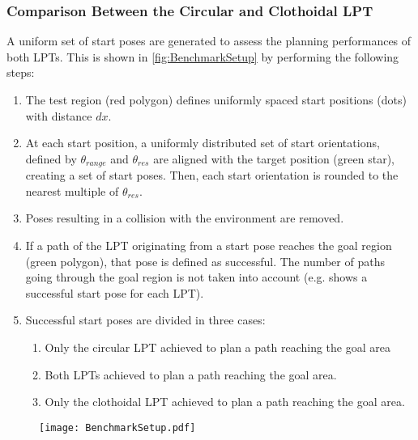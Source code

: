 \newpage

\subsubsection{Comparison Between the Circular and Clothoidal LPT}
A uniform set of start poses are generated to assess the planning performances of both LPTs.
This is shown in \cref{fig:BenchmarkSetup} by performing the following steps:
\vspace{1em}
\begin{enumerate}
\item The test region (red polygon) defines uniformly spaced start positions (dots) with distance $dx$.
\item At each start position, a uniformly distributed set of start orientations, defined by $\theta_{range}$ and $\theta_{res}$ are aligned  with the target position (green star), creating a set of start poses. Then, each start orientation is rounded to the nearest multiple of $\theta_{res}$.
\item Poses resulting in a collision with the environment are removed.
\item If a path of the LPT originating from a start pose reaches the goal region (green polygon), that pose is defined as successful. The number of paths going through the goal region is not taken into account (e.g.  shows a successful start pose for each LPT).
\item Successful start poses are divided in three cases:
\begin{enumerate}
	\item Only the circular LPT achieved to plan a path reaching the goal area
	\item Both LPTs achieved to plan a path reaching the goal area. 
	\item Only the clothoidal LPT achieved to plan a path reaching the goal area.
\end{enumerate}
\end{enumerate}

\begin{figure}[!htbp]
	\centering
	\texttt{[image: BenchmarkSetup.pdf]}
\end{figure}


